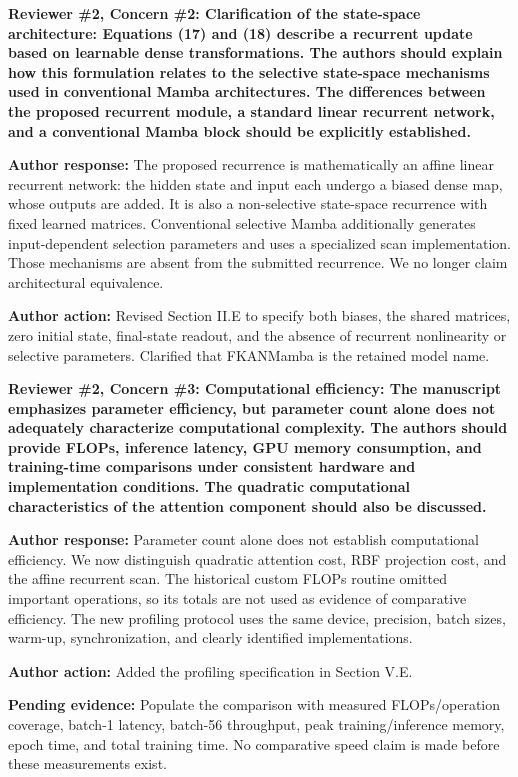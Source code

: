 \documentclass[a4paper,onecolumn,11pt]{IEEEtran}
\newcommand{\pending}[1]{\par\noindent\textcolor{red!70!black}{\textbf{Pending evidence:} #1}\par}
\begin{document}
\vspace{1.5em}
{\color{reviewgreen}\textbf{Reviewer \#2, Concern \#2: Clarification of the state-space architecture: Equations (17) and (18) describe a recurrent update based on learnable dense transformations. The authors should explain how this formulation relates to the selective state-space mechanisms used in conventional Mamba architectures. The differences between the proposed recurrent module, a standard linear recurrent network, and a conventional Mamba block should be explicitly established. }}

\textbf{Author response:}
The proposed recurrence is mathematically an affine linear recurrent network: the hidden state and input each undergo a biased dense map, whose outputs are added. It is also a non-selective state-space recurrence with fixed learned matrices. Conventional selective Mamba additionally generates input-dependent selection parameters and uses a specialized scan implementation. Those mechanisms are absent from the submitted recurrence. We no longer claim architectural equivalence.

\textbf{Author action:}
Revised Section II.E to specify both biases, the shared matrices, zero initial state, final-state readout, and the absence of recurrent nonlinearity or selective parameters. Clarified that FKANMamba is the retained model name.

\vspace{1.5em}
{\color{reviewgreen}\textbf{Reviewer \#2, Concern \#3: Computational efficiency: The manuscript emphasizes parameter efficiency, but parameter count alone does not adequately characterize computational complexity. The authors should provide FLOPs, inference latency, GPU memory consumption, and training-time comparisons under consistent hardware and implementation conditions. The quadratic computational characteristics of the attention component should also be discussed. }}

\textbf{Author response:}
Parameter count alone does not establish computational efficiency. We now distinguish quadratic attention cost, RBF projection cost, and the affine recurrent scan. The historical custom FLOPs routine omitted important operations, so its totals are not used as evidence of comparative efficiency. The new profiling protocol uses the same device, precision, batch sizes, warm-up, synchronization, and clearly identified implementations.

\textbf{Author action:}
Added the profiling specification in Section V.E. \pending{Populate the comparison with measured FLOPs/operation coverage, batch-1 latency, batch-56 throughput, peak training/inference memory, epoch time, and total training time. No comparative speed claim is made before these measurements exist.}
\end{document}
